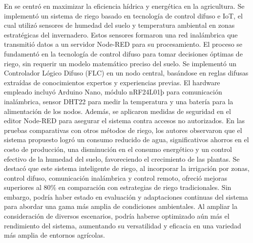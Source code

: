 \bigbreak
En \cite{benyezza_zoning_2021} se centró en maximizar la eficiencia hídrica y energética en la agricultura. Se implementó un sistema de riego basado en tecnología de control difuso e IoT, el cual utilizó sensores de humedad del suelo y temperatura ambiental en zonas estratégicas del invernadero. Estos sensores formaron una red inalámbrica que transmitió datos a un servidor Node-RED para su procesamiento. El proceso se fundamentó en la tecnología de control difuso para tomar decisiones óptimas de riego, sin requerir un modelo matemático preciso del suelo. Se implementó un Controlador Lógico Difuso (FLC) en un nodo central, basándose en reglas difusas extraídas de conocimientos expertos y experiencias previas. El hardware empleado incluyó Arduino Nano, módulo nRF24L01þ para comunicación inalámbrica, sensor DHT22 para medir la temperatura y una batería para la alimentación de los nodos. Además, se aplicaron medidas de seguridad en el editor Node-RED para asegurar el sistema contra accesos no autorizados. En las pruebas comparativas con otros métodos de riego, los autores observaron que el sistema propuesto logró un consumo reducido de agua, significativos ahorros en el costo de producción, una disminución en el consumo energético y un control efectivo de la humedad del suelo, favoreciendo el crecimiento de las plantas. Se destacó que este sistema inteligente de riego, al incorporar la irrigación por zonas, control difuso, comunicación inalámbrica y control remoto, ofreció mejoras superiores al 80\% en comparación con estrategias de riego tradicionales. Sin embargo, podría haber estado en evaluación y adaptaciones continuas del sistema para abordar una gama más amplia de condiciones ambientales. Al ampliar la consideración de diversos escenarios, podría haberse optimizado aún más el rendimiento del sistema, aumentando su versatilidad y eficacia en una variedad más amplia de entornos agrícolas.

